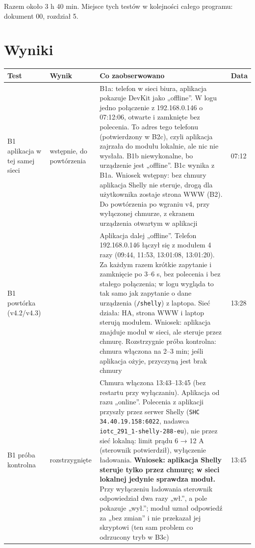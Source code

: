 \documentclass[11pt,a4paper]{article}
\begin{document}
Razem około 3 h 40 min. Miejsce tych testów w kolejności całego programu: dokument 00, rozdział 5.


\section{Wyniki}

\begin{longtable}{>{\raggedright\arraybackslash}p{3.00cm}>{\raggedright\arraybackslash}p{2.62cm}>{\raggedright\arraybackslash}p{7.10cm}>{\raggedright\arraybackslash}p{2.11cm}}
\toprule
\rowcolor{apteallight}\textbf{Test} & \textbf{Wynik} & \textbf{Co zaobserwowano} & \textbf{Data} \\
\midrule\endhead
\bottomrule\endfoot
B1 aplikacja w tej samej sieci & \leavevmode{\symbolfont\color{apred}\textbf{✘}} wstępnie, do powtórzenia & B1a: telefon w sieci biura, aplikacja pokazuje DevKit jako „offline”. W logu jedno połączenie z 192.168.0.146 o 07:12:06, otwarte i zamknięte bez polecenia. To adres tego telefonu (potwierdzony w B2c), czyli aplikacja zajrzała do modułu lokalnie, ale nic nie wysłała. B1b niewykonalne, bo urządzenie jest „offline”. B1c wynika z B1a. Wniosek wstępny: bez chmury aplikacja Shelly nie steruje, drogą dla użytkownika zostaje strona WWW (B2). Do powtórzenia po wgraniu v4, przy wyłączonej chmurze, z ekranem urządzenia otwartym w aplikacji & 29.09 07:12 \\
B1 powtórka (v4.2/v4.3) & \leavevmode{\symbolfont\color{apred}\textbf{✘}} & Aplikacja dalej „offline”. Telefon 192.168.0.146 łączył się z modułem 4 razy (09:44, 11:53, 13:01:08, 13:01:20). Za każdym razem krótkie zapytanie i zamknięcie po 3–6 s, bez polecenia i bez stałego połączenia; w logu wygląda to tak samo jak zapytanie o dane urządzenia (\texttt{/shelly}) z laptopa. Sieć działa: HA, strona WWW i laptop sterują modułem. Wniosek: aplikacja znajduje moduł w sieci, ale steruje przez chmurę. Rozstrzygnie próba kontrolna: chmura włączona na 2–3 min; jeśli aplikacja ożyje, przyczyną jest brak chmury & 29.09 13:28 \\
B1 próba kontrolna & \leavevmode{\symbolfont\color{apgreen}\textbf{✔}} rozstrzygnięte & Chmura włączona 13:43–13:45 (bez restartu przy wyłączaniu). Aplikacja od razu „online”. Polecenia z aplikacji przyszły przez serwer Shelly (\texttt{SHC 34.\allowbreak{}40.\allowbreak{}19.\allowbreak{}158:\allowbreak{}6022}, nadawca \texttt{iotc\_\allowbreak{}291\_\allowbreak{}1-\allowbreak{}shelly-\allowbreak{}288-\allowbreak{}eu}), nie przez sieć lokalną: limit prądu 6 {\symbolfont→} 12 A (sterownik potwierdził), wyłączenie ładowania. \textbf{Wniosek: aplikacja Shelly steruje tylko przez chmurę; w sieci lokalnej jedynie sprawdza moduł.} Przy wyłączeniu ładowania sterownik odpowiedział dwa razy „wł.”, a pole pokazuje „wył.”; moduł uznał odpowiedź za „bez zmian” i nie przekazał jej skryptowi (ten sam problem co odrzucony tryb w B3c) & 29.09 13:45 \\

\end{longtable}
\end{document}
